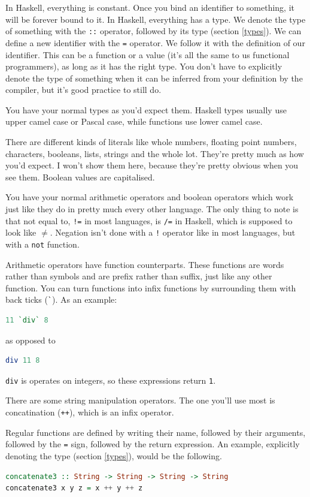 \documentclass[11pt]{article}
\begin{document}
In Haskell, everything is constant. Once you bind an identifier to something,
it will be forever bound to it. In Haskell, everything has a type. We denote
the type of something with the \texttt{::} operator, followed by its type
(section \ref{types}). We can define a new identifier with the \texttt{=}
operator. We follow it with the definition of our identifier. This can be a
function or a value (it's all the same to us functional programmers), as long
as it has the right type. You don't have to explicitly denote the type of
something when it can be inferred from your definition by the compiler, but
it's good practice to still do.

You have your normal types as you'd expect them. Haskell types usually use
upper camel case or Pascal case, while functions use lower camel case.

There are different kinds of literals like whole numbers, floating point
numbers, characters, booleans, lists, strings and the whole lot. They're pretty
much as how you'd expect. I won't show them here, because they're pretty
obvious when you see them. Boolean values are capitalised.

You have your normal arithmetic operators and boolean operators which work just
like they do in pretty much every other language. The only thing to note is
that not equal to, \texttt{!=} in most languages, is \texttt{/=} in Haskell,
which is supposed to look like \(\neq\). Negation isn't done with a \texttt{!}
operator like in most languages, but with a \texttt{not} function.

Arithmetic operators have function counterparts. These functions are words
rather than symbols and are prefix rather than suffix, just like any other
function. You can turn functions into infix functions by surrounding them with
back ticks (\texttt{\`}). As an example:
\begin{lstlisting}[language=Haskell]
11 `div` 8
\end{lstlisting}
as opposed to
\begin{lstlisting}[language=Haskell]
div 11 8
\end{lstlisting}
\texttt{div} is operates on integers, so these expressions return \texttt{1}.

There are some string manipulation operators. The one you'll use most is
concatination (\texttt{++}), which is an infix operator.

Regular functions are defined by writing their name, followed by their
arguments, followed by the \texttt{=} sign, followed by the return expression.
An example, explicitly denoting the type (section \ref{types}), would be the
following.
\begin{lstlisting}[language=Haskell]
concatenate3 :: String -> String -> String -> String
concatenate3 x y z = x ++ y ++ z
\end{lstlisting}
\end{document}
